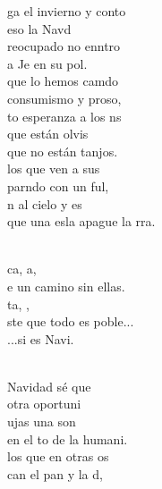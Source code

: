 \documentclass[12pt]{article}
\begin{document}
\begin{multicols*}{2}
\begin{cancion}%
	ga el invierno y conto \\
	eso la Navd\\
	reocupado no enntro \\
	a Je en su pol. \\
\jump
	que lo hemos camdo \\
	 consumismo  y proso,\\
	to esperanza a los ns\\
	que están olvis\\
	que no están tanjos. \\
\jump
	los que ven a sus \\
	parndo con un ful,\\
	n al cielo y es \\
	que una esla apague la rra.\\\jump\\
	\begin{chorus}%
	ca, a, \\
	e un camino sin ellas. \\
	ta, , \\
	ste que todo es poble...\\
	...si es Navi. \\
	\end{chorus}%
	\jump\\
	Navidad sé que \\
	 otra oportuni\\
	ujas una son\\
	en el to de la humani.\\
\jump
	los que en otras os\\
	can el pan y la d, \\

\end{cancion}
\end{multicols*}
\end{document}
